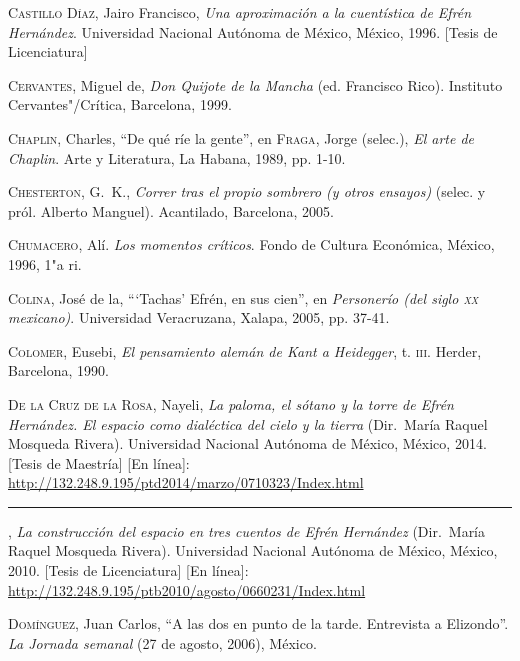 \documentclass[14pt,twoside,final]{extbook} %
\begin{document}
\textsc{Castillo Díaz}, Jairo Francisco, \emph{Una aproximación a la cuentística de Efrén Hernández}. Universidad Nacional Autónoma de México, México, 1996. [Tesis de Licenciatura]\label{bib:castillo1996}

\textsc{Cervantes}, Miguel de, \emph{Don Quijote de la Mancha} (ed. Francisco Rico). Instituto Cervantes"/Crítica, Barcelona, 1999.\label{bib:cervantes1999}

\textsc{Chaplin}, Charles, ``De qué ríe la gente'', en \textsc{Fraga}, Jorge (selec.), \emph{El arte de Chaplin}. Arte y Literatura, La Habana, 1989, pp. 1-10.\label{bib:chaplin1989}

\textsc{Chesterton}, G.~K., \emph{Correr tras el propio sombrero (y otros ensayos)} (selec. y pról. Alberto Manguel). Acantilado, Barcelona, 2005.\label{bib:chesterton2005}

\textsc{Chumacero}, Alí. \emph{Los momentos críticos}. Fondo de Cultura Económica, México, 1996, 1"a ri.

\textsc{Colina}, José de la, ``{}`Tachas' Efrén, en sus cien'', en \emph{Personerío (del siglo \textsc{xx} mexicano)}. Universidad Veracruzana, Xalapa, 2005, pp. 37-41.\label{bib:colina2005}

\textsc{Colomer}, Eusebi, \emph{El pensamiento alemán de Kant a Heidegger}, t. \textsc{iii}. Herder, Barcelona, 1990.\label{bib:colomer1990}

\textsc{De la Cruz de la Rosa}, Nayeli, \textit{\emph{La paloma, el sótano y la torre} de Efrén Hernández. El espacio como dialéctica del cielo y la tierra} (Dir.~María Raquel Mosqueda Rivera). Universidad Nacional Autónoma de México, México, 2014. [Tesis de Maestría] [En línea]: \url{http://132.248.9.195/ptd2014/marzo/0710323/Index.html}\label{bib:delacruz2014}

\rule{1cm}{0.4pt}, \emph{La construcción del espacio en tres cuentos de Efrén Hernández} (Dir.~María Raquel Mosqueda Rivera). Universidad Nacional Autónoma de México, México, 2010. [Tesis de Licenciatura] [En línea]: \url{http://132.248.9.195/ptb2010/agosto/0660231/Index.html}\label{bib:delacruz2010}

\textsc{Domínguez}, Juan Carlos, ``A las dos en punto de la tarde. Entrevista a Elizondo''. \emph{La Jornada semanal} (27 de agosto, 2006), México.\label{bib:dominguez2006}
\end{document}
